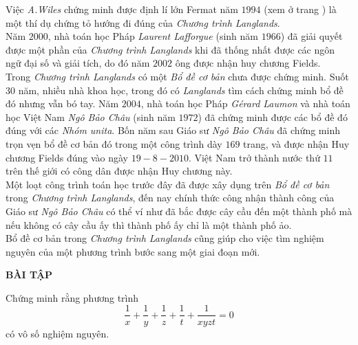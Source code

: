 Việc \textit{A.Wiles} chứng minh được định lí lớn Fermat năm $1994$ (xem ở trang \pageref{lsdlfm}) là một thí dụ chứng tỏ hướng đi đúng của \textit{Chương trình Langlands}.\\
Năm $2000$, nhà toán học Pháp \textit{Laurent Lafforgue} (sinh năm $1966$) đã giải quyết được một phần của \textit{Chương trình Langlands} khi đã thống nhất được các ngôn ngữ đại số và giải tích, do đó năm $2002$ ông được nhận huy chương Fields.\\
Trong \textit{Chương trình Langlands} có một \textit{Bổ đề cơ bản} chưa được chứng minh. Suốt $30$ năm, nhiều nhà khoa học, trong đó có \textit{Langlands} tìm cách chứng minh bổ đề đó nhưng vẫn bó tay. Năm $2004$, nhà toán học Pháp \textit{Gérard Laumon} và nhà toán học Việt Nam \textit{Ngô Bảo Châu} (sinh năm $1972$) đã chứng minh được các bổ đề đó đúng với các \textit{Nhóm unita}. Bốn năm sau Giáo sư \textit{Ngô Bảo Châu} đã chứng minh trọn vẹn bổ đề cơ bản đó trong một công trình dày $169$ trang, và được nhận Huy chương Fields đúng vào ngày $19-8-2010$. Việt Nam trở thành nước thứ $11$ trên thế giới có công dân được nhận Huy chương này. \\
Một loạt công trình toán học trước đây đã được xây dụng trên \textit{Bổ đề cơ bản} trong \textit{Chương trình Langlands}, đến nay chính thức công nhận thành công của Giáo sư \textit{Ngô Bảo Châu} có thể ví như đã bắc được cây cầu đến một thành phố mà nếu không có cây cầu ấy thì thành phố ấy chỉ là một thành phố ảo.\\
Bổ đề cơ bản trong \textit{Chương trình Langlands} cũng giúp cho việc tìm nghiệm nguyên của một phương trình bước sang một giai đoạn mới.\\
\begin{center}
	\bf BÀI TẬP
\end{center}  
\begin{ex}
	Chứng minh rằng phương trình $$\dfrac{1}{x}+\dfrac{1}{y}+\dfrac{1}{z}+\dfrac{1}{t}+\dfrac{1}{xyzt}=0$$ có vô số nghiệm nguyên.
\end{ex}